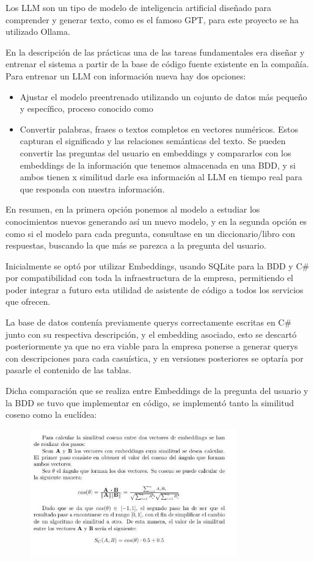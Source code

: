 Los LLM son un tipo de modelo de inteligencia artificial diseñado para comprender y generar texto, como es el famoso GPT, para este proyecto se ha utilizado Ollama.

En la descripción de las prácticas una de las tareas fundamentales era diseñar y entrenar el sistema a partir de la base de código fuente existente en la
compañía. Para entrenar un LLM con información nueva hay dos opciones:
\begin{itemize}
    \item Ajustar el modelo preentrenado utilizando un cojunto de datos más pequeño y específico, proceso conocido como 
    \item Convertir palabras, frases o textos completos en vectores numéricos. Estos  capturan el significado y las relaciones semánticas del texto. Se pueden convertir las preguntas del usuario en embeddings y compararlos con los embeddings de la información que tenemos almacenada en una BDD, y si ambos tienen x similitud darle esa información al LLM en tiempo real para que responda con nuestra información.
\end{itemize}

En resumen, en la primera opción ponemos al modelo a estudiar los conocimientos nuevos generando así un nuevo modelo, y en la segunda opción es como si el modelo para cada pregunta, consultase en un diccionario/libro con respuestas, buscando la que más se parezca a la pregunta del usuario. 

Inicialmente se optó por utilizar Embeddings, usando SQLite para la BDD y C\# por compatibilidad con toda la infraestructura de la empresa, permitiendo el poder integrar a futuro esta utilidad de asistente de código a todos los servicios que ofrecen.

La base de datos contenía previamente querys correctamente escritas en C\# junto con su respectiva descripción, y el embedding asociado, esto se descartó posteriormente ya que no era viable para la empresa ponerse a generar querys con descripciones para cada casuística, y en versiones posteriores se optaría por pasarle el contenido de las tablas.

\newpage
Dicha comparación que se realiza entre Embeddings de la pregunta del usuario y la BDD se tuvo que implementar en código, se implementó tanto la similitud coseno como la euclídea:


\begin{figure}[htbp]
    \centering
    \includegraphics[width=0.8\textwidth]{Chapters/cap4.PNG}
    \label{fig:mi_imagen}
\end{figure}

